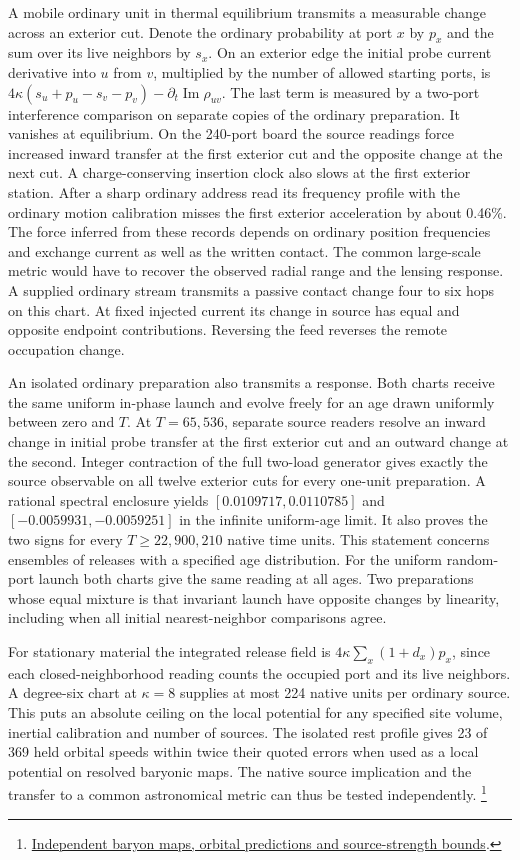 \documentclass[11pt]{article}
\begin{document}
A mobile ordinary unit in thermal equilibrium transmits a measurable
change across an exterior cut. Denote the ordinary probability at port
$x$ by $p_x$ and the sum over its live neighbors by $s_x$.
On an exterior edge the initial probe current derivative into $u$ from
$v$, multiplied by the number of allowed starting ports, is
$4\kappa(s_u+p_u-s_v-p_v)-\partial_t\operatorname{Im}\rho_{uv}$.
The last term is measured by a two-port interference comparison on
separate copies of the ordinary preparation. It vanishes at equilibrium.
On the 240-port board the source readings force increased inward
transfer at the first exterior cut and the opposite change at the next
cut. A charge-conserving insertion clock also slows at the first
exterior station. After a sharp ordinary address read its frequency
profile with the ordinary motion calibration misses the first exterior
acceleration by about 0.46\%. The force inferred from these records
depends on ordinary position frequencies and exchange current as well
as the written contact. The common large-scale metric would have to
recover the observed radial range and the lensing response. A supplied
ordinary stream transmits a passive contact change four to six hops
on this chart. At fixed injected current its change in source has equal
and opposite endpoint contributions. Reversing the feed reverses the
remote occupation change.

An isolated ordinary preparation also transmits a response. Both charts
receive the same uniform in-phase launch and evolve freely for an age
drawn uniformly between zero and $T$. At $T=65{,}536$, separate source
readers resolve an inward change in initial probe transfer at the first
exterior cut and an outward change at the second. Integer contraction
of the full two-load generator gives exactly the source observable on
all twelve exterior cuts for every one-unit preparation. A rational
spectral enclosure yields $[0.0109717,0.0110785]$ and
$[-0.0059931,-0.0059251]$ in the infinite uniform-age limit. It
also proves the two signs for every $T\ge22{,}900{,}210$ native time
units. This statement concerns ensembles of releases with a specified
age distribution. For the uniform random-port launch both charts
give the same reading at all ages. Two preparations whose equal
mixture is that invariant launch have opposite changes by linearity,
including when all initial nearest-neighbor comparisons agree.

For stationary material the integrated release field is
$4\kappa\sum_x(1+d_x)p_x$, since each closed-neighborhood reading
counts the occupied port and its live neighbors. A degree-six chart
at $\kappa=8$ supplies at most 224 native units per ordinary source.
This puts an absolute ceiling on the local potential for any specified
site volume, inertial calibration and number of sources. The isolated
rest profile gives 23 of 369 held orbital speeds within twice their
quoted errors when used as a local potential on resolved baryonic
maps. The native source implication and the transfer to a common
astronomical metric can thus be tested independently.%
\footnote{\href{https://github.com/FloatingPragma/observer-patch-holography/tree/main/code/cosmology/paid_trail_bao}{Independent baryon maps, orbital predictions and source-strength bounds}.}
\end{document}
